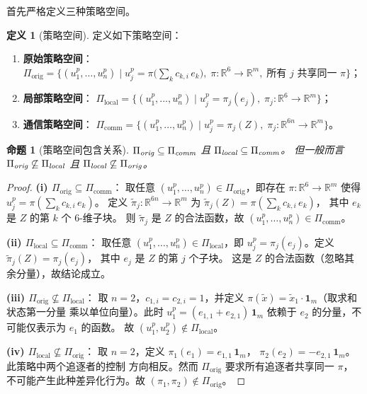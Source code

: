 \documentclass[a4paper,11pt]{article}
\theoremstyle{plain}
\newtheorem{proposition}[theorem]{命题}
\theoremstyle{definition}
\newtheorem{definition}[theorem]{定义}
\theoremstyle{remark}
\newcommand{\R}{\mathbb{R}}
\begin{document}
首先严格定义三种策略空间。

\begin{definition}[策略空间]\label{def:policy_spaces}
  定义如下策略空间：
  \begin{enumerate}[label=(\roman*)]
    \item \textbf{原始策略空间}：
      $\Pi_{\text{orig}} = \bigl\{
        (u_1^p,\dots,u_n^p) \;\big|\;
        u_j^p = \pi\!\bigl(\textstyle\sum_k c_{k,i}\, e_k\bigr),\;
        \pi:\R^6\to\R^m,\;
        \text{所有 } j \text{ 共享同一 } \pi
      \bigr\}$；
    \item \textbf{局部策略空间}：
      $\Pi_{\text{local}} = \bigl\{
        (u_1^p,\dots,u_n^p) \;\big|\;
        u_j^p = \pi_j(e_j),\;
        \pi_j:\R^6\to\R^m
      \bigr\}$；
    \item \textbf{通信策略空间}：
      $\Pi_{\text{comm}} = \bigl\{
        (u_1^p,\dots,u_n^p) \;\big|\;
        u_j^p = \pi_j(Z),\;
        \pi_j:\R^{6n}\to\R^m
      \bigr\}$。
  \end{enumerate}
\end{definition}

\begin{proposition}[策略空间包含关系]\label{prop:policy_inclusion}
  $\Pi_{\emph{orig}} \subseteq \Pi_{\emph{comm}}$ 且
  $\Pi_{\emph{local}} \subseteq \Pi_{\emph{comm}}$。
  但一般而言 $\Pi_{\emph{orig}} \not\subseteq \Pi_{\emph{local}}$
  且 $\Pi_{\emph{local}} \not\subseteq \Pi_{\emph{orig}}$。
\end{proposition}

\begin{proof}
  \textbf{(i) $\Pi_{\text{orig}} \subseteq \Pi_{\text{comm}}$}：
  取任意 $(u_1^p,\dots,u_n^p) \in \Pi_{\text{orig}}$，即存在
  $\pi:\R^6\to\R^m$ 使得 $u_j^p = \pi(\sum_k c_{k,i}\, e_k)$。
  定义 $\tilde{\pi}_j : \R^{6n} \to \R^m$ 为
  $\tilde{\pi}_j(Z) = \pi(\sum_k c_{k,i}\, e_k)$，
  其中 $e_k$ 是 $Z$ 的第 $k$ 个 $6$-维子块。
  则 $\tilde{\pi}_j$ 是 $Z$ 的合法函数，故
  $(u_1^p,\dots,u_n^p) \in \Pi_{\text{comm}}$。

  \textbf{(ii) $\Pi_{\text{local}} \subseteq \Pi_{\text{comm}}$}：
  取任意 $(u_1^p,\dots,u_n^p) \in \Pi_{\text{local}}$，即
  $u_j^p = \pi_j(e_j)$。定义 $\tilde{\pi}_j(Z) = \pi_j(e_j)$，
  其中 $e_j$ 是 $Z$ 的第 $j$ 个子块。
  这是 $Z$ 的合法函数（忽略其余分量），故结论成立。

  \textbf{(iii) $\Pi_{\text{orig}} \not\subseteq \Pi_{\text{local}}$}：
  取 $n = 2$，$c_{1,i} = c_{2,i} = 1$，并定义
  $\pi(\tilde{x}) = \tilde{x}_1 \cdot \mathbf{1}_m$（取求和状态第一分量
  乘以单位向量）。此时 $u_1^p = (e_{1,1} + e_{2,1})\,\mathbf{1}_m$
  依赖于 $e_2$ 的分量，不可能仅表示为 $e_1$ 的函数。
  故 $(u_1^p, u_2^p) \notin \Pi_{\text{local}}$。

  \textbf{(iv) $\Pi_{\text{local}} \not\subseteq \Pi_{\text{orig}}$}：
  取 $n = 2$，定义 $\pi_1(e_1) = e_{1,1}\, \mathbf{1}_m$，
  $\pi_2(e_2) = -e_{2,1}\, \mathbf{1}_m$。此策略中两个追逐者的控制
  方向相反。然而 $\Pi_{\text{orig}}$ 要求所有追逐者共享同一 $\pi$，
  不可能产生此种差异化行为。故
  $(\pi_1, \pi_2) \notin \Pi_{\text{orig}}$。
\end{proof}
\end{document}
